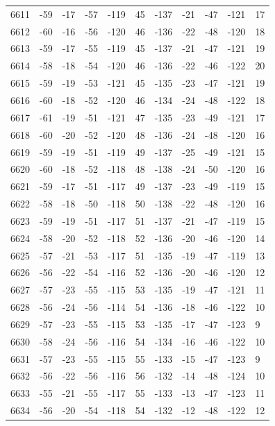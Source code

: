 \begin{table}[H]
\begin{tabular}{lllllllllll}
6611 & -59 & -17 & -57 & -119 & 45 & -137 & -21 & -47 & -121 & 17 \\
6612 & -60 & -16 & -56 & -120 & 46 & -136 & -22 & -48 & -120 & 18 \\
6613 & -59 & -17 & -55 & -119 & 45 & -137 & -21 & -47 & -121 & 19 \\
6614 & -58 & -18 & -54 & -120 & 46 & -136 & -22 & -46 & -122 & 20 \\
6615 & -59 & -19 & -53 & -121 & 45 & -135 & -23 & -47 & -121 & 19 \\
6616 & -60 & -18 & -52 & -120 & 46 & -134 & -24 & -48 & -122 & 18 \\
6617 & -61 & -19 & -51 & -121 & 47 & -135 & -23 & -49 & -121 & 17 \\
6618 & -60 & -20 & -52 & -120 & 48 & -136 & -24 & -48 & -120 & 16 \\
6619 & -59 & -19 & -51 & -119 & 49 & -137 & -25 & -49 & -121 & 15 \\
6620 & -60 & -18 & -52 & -118 & 48 & -138 & -24 & -50 & -120 & 16 \\
6621 & -59 & -17 & -51 & -117 & 49 & -137 & -23 & -49 & -119 & 15 \\
6622 & -58 & -18 & -50 & -118 & 50 & -138 & -22 & -48 & -120 & 16 \\
6623 & -59 & -19 & -51 & -117 & 51 & -137 & -21 & -47 & -119 & 15 \\
6624 & -58 & -20 & -52 & -118 & 52 & -136 & -20 & -46 & -120 & 14 \\
6625 & -57 & -21 & -53 & -117 & 51 & -135 & -19 & -47 & -119 & 13 \\
6626 & -56 & -22 & -54 & -116 & 52 & -136 & -20 & -46 & -120 & 12 \\
6627 & -57 & -23 & -55 & -115 & 53 & -135 & -19 & -47 & -121 & 11 \\
6628 & -56 & -24 & -56 & -114 & 54 & -136 & -18 & -46 & -122 & 10 \\
6629 & -57 & -23 & -55 & -115 & 53 & -135 & -17 & -47 & -123 & 9 \\
6630 & -58 & -24 & -56 & -116 & 54 & -134 & -16 & -46 & -122 & 10 \\
6631 & -57 & -23 & -55 & -115 & 55 & -133 & -15 & -47 & -123 & 9 \\
6632 & -56 & -22 & -56 & -116 & 56 & -132 & -14 & -48 & -124 & 10 \\
6633 & -55 & -21 & -55 & -117 & 55 & -133 & -13 & -47 & -123 & 11 \\
6634 & -56 & -20 & -54 & -118 & 54 & -132 & -12 & -48 & -122 & 12 \\

\end{tabular}
\end{table}
